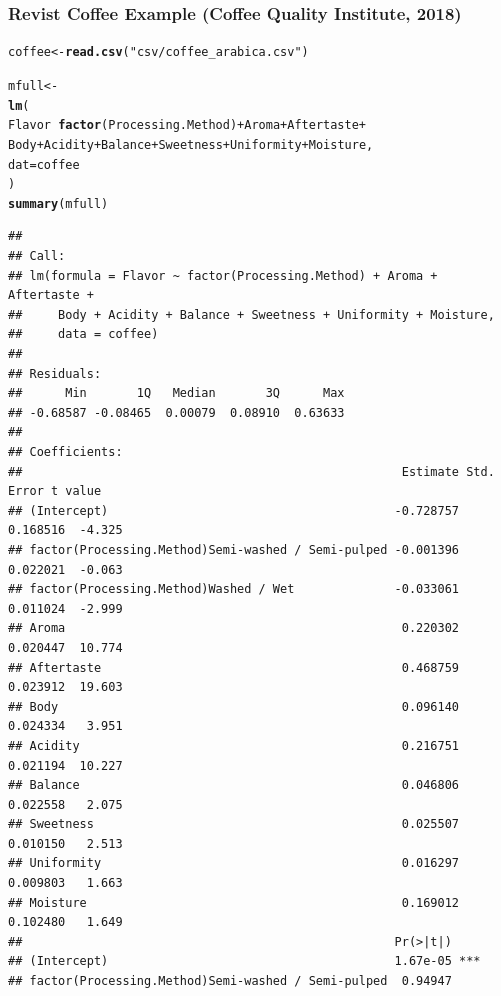 \documentclass[oneside]{book}\usepackage[]{graphicx}\usepackage[dvipsnames,table,xcdraw]{xcolor}
\makeatletter
\newcommand{\hlstr}[1]{\textcolor[rgb]{0.192,0.494,0.8}{#1}}%
\newcommand{\hlopt}[1]{\textcolor[rgb]{0,0,0}{#1}}%
\newcommand{\hlstd}[1]{\textcolor[rgb]{0.345,0.345,0.345}{#1}}%
\newcommand{\hlkwb}[1]{\textcolor[rgb]{0.69,0.353,0.396}{#1}}%
\newcommand{\hlkwc}[1]{\textcolor[rgb]{0.333,0.667,0.333}{#1}}%
\newcommand{\hlkwd}[1]{\textcolor[rgb]{0.737,0.353,0.396}{\textbf{#1}}}%
\newenvironment{kframe}{%
 \def\at@end@of@kframe{}%
 \ifinner\ifhmode%
  \def\at@end@of@kframe{\end{minipage}}%
  \begin{minipage}{\columnwidth}%
 \fi\fi%
 \def\FrameCommand##1{\hskip\@totalleftmargin \hskip-\fboxsep
 \colorbox{shadecolor}{##1}\hskip-\fboxsep
     \hskip-\linewidth \hskip-\@totalleftmargin \hskip\columnwidth}%
 \MakeFramed {\advance\hsize-\width
   \@totalleftmargin\z@ \linewidth\hsize
   \@setminipage}}%
 {\par\unskip\endMakeFramed%
 \at@end@of@kframe}
\newenvironment{knitrout}{}{} %
\makeatother
\begin{document}
    \subsubsection{Revist Coffee Example (Coffee Quality Institute, 2018)}

\begin{knitrout}
\color{fgcolor}\begin{kframe}
\begin{alltt}
\hlstd{coffee} \hlkwb{<-} \hlkwd{read.csv}\hlstd{(}\hlstr{"csv/coffee_arabica.csv"}\hlstd{)}

\hlstd{mfull} \hlkwb{<-}
\hlkwd{lm}\hlstd{(}
\hlstd{Flavor} \hlopt{~} \hlkwd{factor}\hlstd{(Processing.Method)} \hlopt{+} \hlstd{Aroma} \hlopt{+} \hlstd{Aftertaste} \hlopt{+}
\hlstd{Body} \hlopt{+} \hlstd{Acidity} \hlopt{+} \hlstd{Balance} \hlopt{+} \hlstd{Sweetness} \hlopt{+} \hlstd{Uniformity} \hlopt{+} \hlstd{Moisture,}
\hlkwc{dat} \hlstd{= coffee}
\hlstd{)}
\hlkwd{summary}\hlstd{(mfull)}
\end{alltt}
\begin{verbatim}
## 
## Call:
## lm(formula = Flavor ~ factor(Processing.Method) + Aroma + Aftertaste + 
##     Body + Acidity + Balance + Sweetness + Uniformity + Moisture, 
##     data = coffee)
## 
## Residuals:
##      Min       1Q   Median       3Q      Max 
## -0.68587 -0.08465  0.00079  0.08910  0.63633 
## 
## Coefficients:
##                                                     Estimate Std. Error t value
## (Intercept)                                        -0.728757   0.168516  -4.325
## factor(Processing.Method)Semi-washed / Semi-pulped -0.001396   0.022021  -0.063
## factor(Processing.Method)Washed / Wet              -0.033061   0.011024  -2.999
## Aroma                                               0.220302   0.020447  10.774
## Aftertaste                                          0.468759   0.023912  19.603
## Body                                                0.096140   0.024334   3.951
## Acidity                                             0.216751   0.021194  10.227
## Balance                                             0.046806   0.022558   2.075
## Sweetness                                           0.025507   0.010150   2.513
## Uniformity                                          0.016297   0.009803   1.663
## Moisture                                            0.169012   0.102480   1.649
##                                                    Pr(>|t|)    
## (Intercept)                                        1.67e-05 ***
## factor(Processing.Method)Semi-washed / Semi-pulped  0.94947    

\end{verbatim}
\end{kframe}
\end{knitrout}
\end{document}
